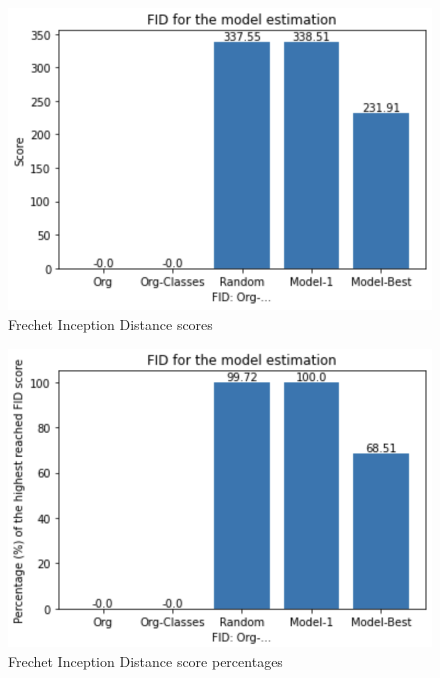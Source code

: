 \documentclass[runningheads]{llncs}
\begin{document}
\begin{minipage}{0.47\textwidth}
    \begin{figure}[H]
        \centering
        \includegraphics[scale=0.4]{img/FID_scores.png}
        \caption{Frechet Inception Distance scores}
        \label{img:fid_results}
    \end{figure}
\end{minipage}
\hfill
\begin{minipage}{0.47\textwidth}
    \begin{figure}[H]
        \centering
        \includegraphics[scale=0.36]{img/FID_percentages.png}
        \caption{Frechet Inception Distance score percentages}
        \label{img:fid_results_percetages}
    \end{figure}
\end{minipage}
\end{document}
